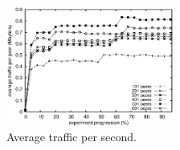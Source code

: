 

\begin{figure}
  \centering
  \includegraphics[width=0.49\textwidth]{img/traffic.eps}
  \caption{Average traffic per second.}
\end{figure}

